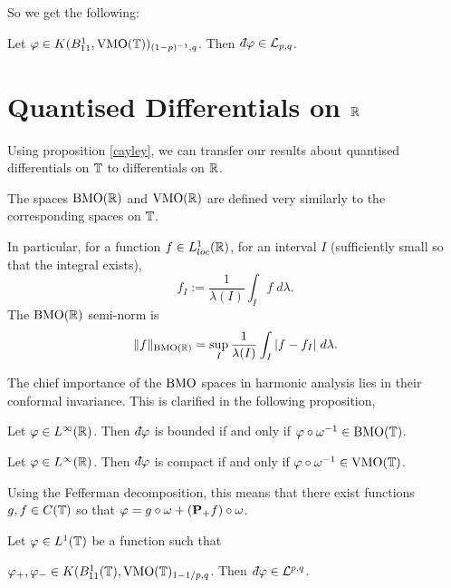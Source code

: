 So we get the following:
\begin{corollary}
    Let $\varphi\in K(B_{11}^1,\operatorname{VMO}(\mathbb{T}))_{(1-p)^{-1},q}$. Then $\qd \varphi \in \mathcal{L}_{p,q}$. 
\end{corollary}

\section{Quantised Differentials on $\mathbb{R}$}
Using proposition \ref{cayley}, we can transfer our results
about quantised differentials on $\mathbb{T}$ to differentials on $\mathbb{R}$.

\begin{definition}
    The spaces $\operatorname{BMO}(\mathbb{R})$ and $\operatorname{VMO}(\mathbb{R})$ are defined
    very similarly to the corresponding spaces on $\mathbb{T}$. 
    
    In particular, for a function $f \in L^1_{loc}(\mathbb{R})$, for
    an interval $I$ (sufficiently small so that the integral exists),
    \begin{equation}
        f_I := \frac{1}{\lambda(I)}\int_I f\;d\lambda.
    \end{equation}
    The $\operatorname{BMO}(\mathbb{R})$ semi-norm is
    \begin{equation}
        \|f\|_{\operatorname{BMO}(\mathbb{R})} = \sup_{I} \frac{1}{\lambda(I)}\int_I |f-f_I|\;d\lambda.
    \end{equation}
\end{definition}

The chief importance of the $\operatorname{BMO}$ spaces in harmonic analysis
lies in their conformal invariance. This is clarified in the following proposition,

\begin{proposition}

\end{proposition}

\begin{proposition}
    Let $\varphi \in L^\infty(\mathbb{R})$. Then $\qd \varphi$
    is bounded if and only if $\varphi \circ \omega^{-1} \in \operatorname{BMO}(\mathbb{T})$.
\end{proposition}
\begin{proposition}
    Let $\varphi \in L^\infty(\mathbb{R})$. Then $\qd \varphi$ is compact
    if and only if $\varphi \circ \omega^{-1} \in \operatorname{VMO}(\mathbb{T})$.
    
    Using the Fefferman decomposition, this means that 
    there exist functions $g,f \in C(\mathbb{T})$ so that
    $\varphi = g\circ\omega + (\mathbf{P}_+f)\circ \omega$. 
\end{proposition}

\begin{proposition}
    Let $\varphi\in L^1(\mathbb{T})$ be a function such that
    
    $\varphi_+,\varphi_- \in K(B_{11}^1(\mathbb{T}),\operatorname{VMO}(\mathbb{T})_{1-1/p,q}$. Then $\qd \varphi \in \mathcal{L}^{p,q}$.
\end{proposition}

